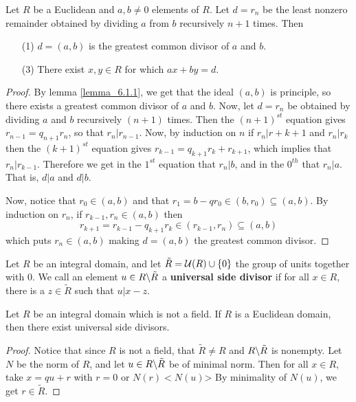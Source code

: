 \begin{theorem}\label{theorem_6.1.6}
  Let $R$ be a Euclidean and $a,b \neq 0$ elements of  $R$. Let  $d=r_n$ be
  the least nonzero remainder obtained by dividing $a$ from $b$ recursively
  $n+1$ times. Then
  \begin{enumerate}
    \item[(1)] $d=(a,b)$ is the greatest common divisor of $a$ and  $b$.

    \item[(3)] There exist $x,y \in R$ for which  $ax+by=d$.
  \end{enumerate}
\end{theorem}
\begin{proof}
  By lemma \ref{lemma_6.1.1}, we get that the ideal $(a,b)$ is principle, so there
  exists a greatest common divisor of $a$ and  $b$. Now, let  $d=r_n$ be
  obtained by dividing $a$ and $b$ recursively $(n+1)$ times. Then the
  $(n+1)^{st}$ equation gives $r_{n-1}=q_{n+1}r_n$, so that $r_n|r_{n-1}$.
  Now, by induction on $n$ if  $r_n|r+{k+1}$ and $r_n|r_k$ then the
  $(k+1)^{st}$ equation gives $r_{k-1}=q_{k+1}r_k+r_{k+1}$, which implies that
  $r_n|r_{k-1}$. Therefore we get in the $1^{st}$ equation that $r_n|b$, and in
  the $0^{th}$ that $r_n|a$. That is,  $d|a$ and  $d|b$.

  Now, notice that $r_0 \in (a,b)$ and that $r_1=b-qr_0 \in (b,r_0) \subseteq
  (a,b)$. By induction on $r_n$, if  $r_{k-1},r_n \in (a,b)$ then
  \begin{equation*}
    r_{k+1}=r_{k-1}-q_{k+1}r_k \in (r_{k-1},r_n) \subseteq (a,b)
  \end{equation*}
  which puts $r_n \in (a,b)$ making $d=(a,b)$ the greatest common divisor.
\end{proof}

\begin{definition}
  Let $R$ be an integral domain, and let
  $\tilde{R}=\mathcal{U}{(R)} \cup \{0\}$ the group of units together with $0$.
  We call an element  $u \in R \backslash \tilde{R}$ a \textbf{universal side
  divisor} if for all $x \in R$, there is a  $z \in \tilde{R}$ such that
  $u|x-z$.
\end{definition}

\begin{lemma}\label{lemma_6.1.7}
  Let $R$ be an integral domain which is not a field. If $R$ is a Euclidean
  domain, then there exist universal side divisors.
\end{lemma}
\begin{proof}
  Notice that since $R$ is not a field, that $\tilde{R} \neq R$ and
  $R \backslash \tilde{R}$ is nonempty. Let $N$ be the norm of  $R$, and let  $u
  \in R \backslash \tilde{R}$ be of minimal norm. Then for all $x \in R$, take
  $x=qu+r$ with  $r=0$ or  $N(r)<N(u)$> By minimality of $N(u)$, we get $r \in
  \tilde{R}$.
\end{proof}

